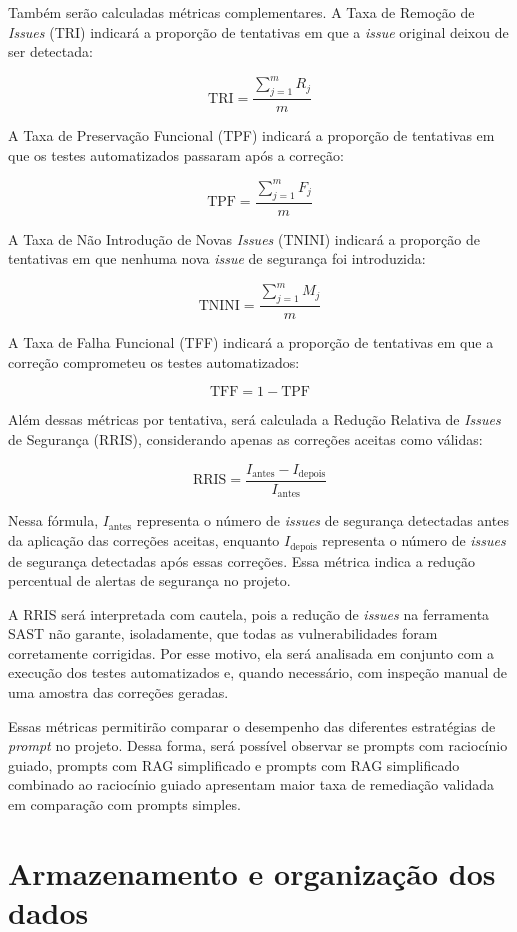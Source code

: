 Também serão calculadas métricas complementares. A Taxa de Remoção de \textit{Issues} (TRI) indicará a proporção de tentativas em que a \textit{issue} original deixou de ser detectada:

\[
\text{TRI} = \frac{\sum_{j=1}^{m} R_j}{m}
\]

A Taxa de Preservação Funcional (TPF) indicará a proporção de tentativas em que os testes automatizados passaram após a correção:

\[
\text{TPF} = \frac{\sum_{j=1}^{m} F_j}{m}
\]

A Taxa de Não Introdução de Novas \textit{Issues} (TNINI) indicará a proporção de tentativas em que nenhuma nova \textit{issue} de segurança foi introduzida:

\[
\text{TNINI} = \frac{\sum_{j=1}^{m} M_j}{m}
\]

A Taxa de Falha Funcional (TFF) indicará a proporção de tentativas em que a correção comprometeu os testes automatizados:

\[
\text{TFF} = 1 - \text{TPF}
\]

Além dessas métricas por tentativa, será calculada a Redução Relativa de \textit{Issues} de Segurança (RRIS), considerando apenas as correções aceitas como válidas:

\[
\text{RRIS} = \frac{I_{\text{antes}} - I_{\text{depois}}}{I_{\text{antes}}}
\]

Nessa fórmula, $I_{\text{antes}}$ representa o número de \textit{issues} de segurança detectadas antes da aplicação das correções aceitas, enquanto $I_{\text{depois}}$ representa o número de \textit{issues} de segurança detectadas após essas correções. Essa métrica indica a redução percentual de alertas de segurança no projeto.

A RRIS será interpretada com cautela, pois a redução de \textit{issues} na ferramenta SAST não garante, isoladamente, que todas as vulnerabilidades foram corretamente corrigidas. Por esse motivo, ela será analisada em conjunto com a execução dos testes automatizados e, quando necessário, com inspeção manual de uma amostra das correções geradas.

Essas métricas permitirão comparar o desempenho das diferentes estratégias de \textit{prompt} no projeto. Dessa forma, será possível observar se prompts com raciocínio guiado, prompts com RAG simplificado e prompts com RAG simplificado combinado ao raciocínio guiado apresentam maior taxa de remediação validada em comparação com prompts simples.

\section{Armazenamento e organização dos dados}

